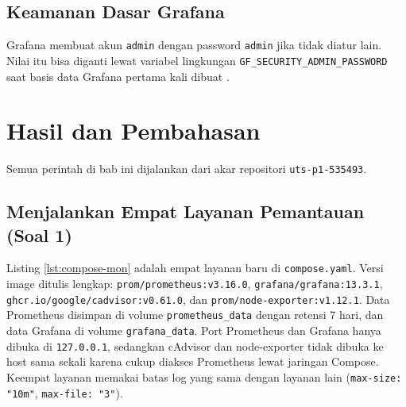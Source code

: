 \documentclass[a4paper,oneside,12pt]{report}
\newcommand{\tocboldsection}[1]{%
  \protect\renewcommand{\protect\cftchapfont}{\protect\bfseries}%
  #1%
  \protect\renewcommand{\protect\cftchapfont}{}%
}
\begin{document}
\section{Keamanan Dasar Grafana}
Grafana membuat akun \texttt{admin} dengan password \texttt{admin} jika tidak diatur lain. Nilai itu bisa diganti lewat variabel lingkungan \texttt{GF\_SECURITY\_ADMIN\_PASSWORD} saat basis data Grafana pertama kali dibuat \cite{grafana-config}.

\clearpage

\chapter[\texorpdfstring{\tocboldsection{Hasil dan Pembahasan}}{Hasil dan Pembahasan}]{Hasil dan Pembahasan}

Semua perintah di bab ini dijalankan dari akar repositori \texttt{uts-p1-535493}.

\section{Menjalankan Empat Layanan Pemantauan (Soal 1)}
Listing \ref{lst:compose-mon} adalah empat layanan baru di \texttt{compose.yaml}. Versi image ditulis lengkap: \texttt{prom/prometheus:v3.16.0}, \texttt{grafana/grafana:13.3.1}, \texttt{ghcr.io/google/cadvisor:v0.61.0}, dan \texttt{prom/node-exporter:v1.12.1}. Data Prometheus disimpan di volume \texttt{prometheus\_data} dengan retensi 7 hari, dan data Grafana di volume \texttt{grafana\_data}. Port Prometheus dan Grafana hanya dibuka di \texttt{127.0.0.1}, sedangkan cAdvisor dan node-exporter tidak dibuka ke host sama sekali karena cukup diakses Prometheus lewat jaringan Compose. Keempat layanan memakai batas log yang sama dengan layanan lain (\texttt{max-size: "10m"}, \texttt{max-file: "3"}).
\end{document}
